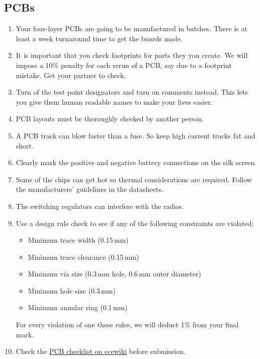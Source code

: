 \documentclass[11pt, a4paper]{article}
\begin{document}
\subsection{PCBs}

\begin{enumerate}
\item Your four-layer PCBs are going to be manufactured in batches.
  There is at least a week turnaround time to get the boards made.

\item It is important that you check footprints for parts they you
  create.  We will impose a 10\% penalty for each rerun of a PCB, say
  due to a footprint mistake.  Get your partner to check.

\item Turn of the test point designators and turn on comments instead. This lets
  you give them human readable names to make your lives easier.

\item PCB layouts must be thoroughly checked by another person.

\item A PCB track can blow faster than a fuse. So keep high current
  tracks fat and short.

\item Clearly mark the positive and negative battery connections on
  the silk screen.

\item Some of the chips can get hot so thermal considerations are
  required.  Follow the manufacturers' guidelines in the datasheets.

\item The switching regulators can interfere with the radios.

\item Use a design rule check to see if any of the following
  constraints are violated:
%
\begin{itemize}
\item Minimum trace width (0.15\,mm)
\item Minimum trace clearance (0.15\,mm)
\item Minimum via size (0.3\,mm hole, 0.6\,mm outer diameter)
\item Minimum hole size (0.3\,mm)
\item Minimum annular ring (0.1\,mm)
\end{itemize}
%
For every violation of one these rules, we will deduct 1\% from your
final mark.

\item Check the
  \href{http://ecewiki.elec.canterbury.ac.nz/mediawiki/index.php/PCB_checklist}{PCB
    checklist on ecewiki} before submission.
\end{enumerate}
\end{document}
